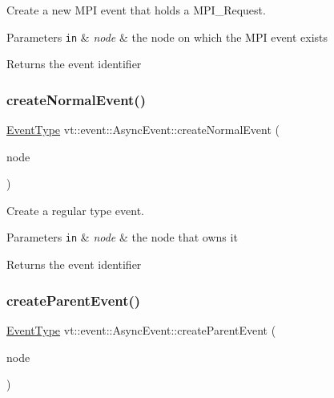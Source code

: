 Create a new M\+PI event that holds a M\+P\+I\+\_\+\+Request. 


\begin{DoxyParams}[1]{Parameters}
\mbox{\tt in}  & {\em node} & the node on which the M\+PI event exists\\
\hline
\end{DoxyParams}
\begin{DoxyReturn}{Returns}
the event identifier 
\end{DoxyReturn}
\mbox{\label{structvt_1_1event_1_1_async_event_aa7c07c129ba54bde5abbe95c543ca352}} 
\subsubsection{\texorpdfstring{create\+Normal\+Event()}{createNormalEvent()}}
{\footnotesize\ttfamily \hyperlink{namespacevt_a009267401def7ae8bf201892222d060f}{Event\+Type} vt\+::event\+::\+Async\+Event\+::create\+Normal\+Event (\begin{DoxyParamCaption}\item[{\hyperlink{namespacevt_a866da9d0efc19c0a1ce79e9e492f47e2}{Node\+Type} const \&}]{node }\end{DoxyParamCaption})}



Create a regular type event. 


\begin{DoxyParams}[1]{Parameters}
\mbox{\tt in}  & {\em node} & the node that owns it\\
\hline
\end{DoxyParams}
\begin{DoxyReturn}{Returns}
the event identifier 
\end{DoxyReturn}
\mbox{\label{structvt_1_1event_1_1_async_event_a9646f211d660d2e991df07b77e5f2cc6}} 
\subsubsection{\texorpdfstring{create\+Parent\+Event()}{createParentEvent()}}
{\footnotesize\ttfamily \hyperlink{namespacevt_a009267401def7ae8bf201892222d060f}{Event\+Type} vt\+::event\+::\+Async\+Event\+::create\+Parent\+Event (\begin{DoxyParamCaption}\item[{\hyperlink{namespacevt_a866da9d0efc19c0a1ce79e9e492f47e2}{Node\+Type} const \&}]{node }\end{DoxyParamCaption})}



